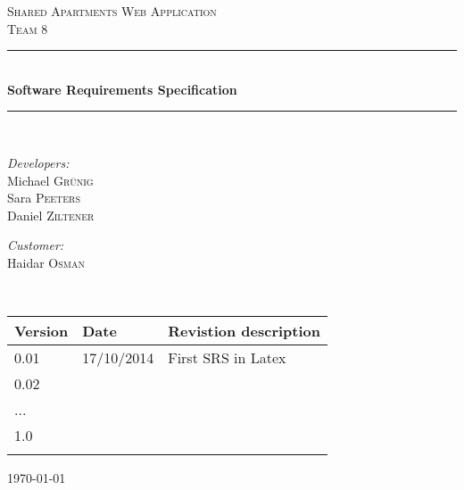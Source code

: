 \begin{titlepage}
\begin{center}



\textsc{\LARGE Shared Apartments Web Application}\\[1.0cm]
\textsc{\Large Team 8}\\[1.5cm]
\newcommand{\HRule}{\rule{\linewidth}{0.5mm}}
\HRule \\[0.4cm]
{ \huge \bfseries Software Requirements Specification}\\[0.4cm]

\HRule \\[1.5cm]

\begin{minipage}{0.4\textwidth}
\begin{flushleft} \large
\emph{Developers:}\\
Michael \textsc{Gr\"unig}\\
Sara \textsc{Peeters}\\
Daniel \textsc{Ziltener}
\end{flushleft}
\end{minipage}
\hfill
\begin{minipage}{0.4\textwidth}
\begin{flushright} \large
\emph{Customer:} \\
Haidar \textsc{Osman}
\end{flushright}
\end{minipage}
\\[1.5cm]
\begin{tabular}{|l|l|l|}
\hline
\textbf{Version}&\textbf{Date}&\textbf{Revistion description}\\ \hline
0.01 & 17/10/2014 & First SRS in Latex \\ \hline
0.02 & & \\ \hline
... & & \\ \hline
1.0  & & \\ \hline
 & & \\ \hline
\end{tabular}

\vfill

{\large \today}

\end{center}

\end{titlepage}